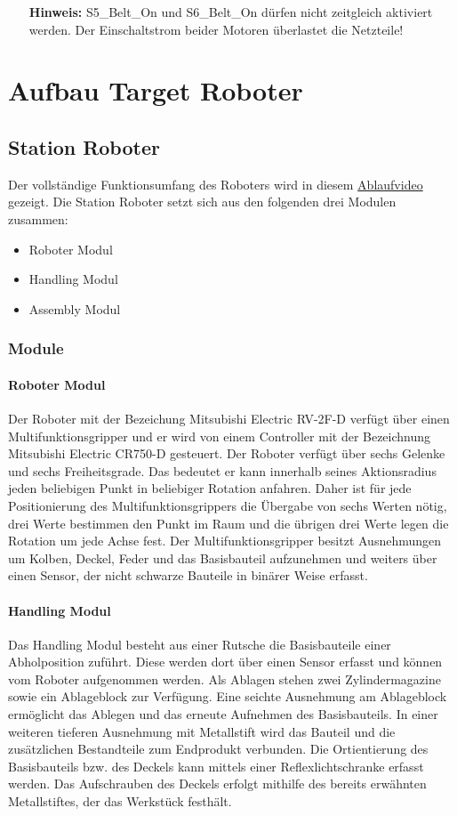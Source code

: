 \documentclass[11pt,a4paper,ngerman]{article}
\begin{document}
\begin{itemize}
	\item[\bf Hinweis:] S5\_Belt\_On und S6\_Belt\_On dürfen nicht zeitgleich aktiviert werden. Der Einschaltstrom beider Motoren überlastet die Netzteile!
\end{itemize}

\section{Aufbau Target Roboter}

\subsection{Station Roboter}
Der vollständige Funktionsumfang des Roboters wird in diesem \href{https://www.youtube.com/watch?v=lkq4dzfn4Q0}{Ablaufvideo} gezeigt. Die Station Roboter setzt sich aus den folgenden drei Modulen zusammen:
\begin{itemize}
	\item Roboter Modul
	\item Handling Modul
	\item Assembly Modul
\end{itemize}
\subsubsection{Module}
\paragraph{Roboter Modul}
Der Roboter mit der Bezeichung Mitsubishi Electric RV-2F-D verfügt über einen Multifunktionsgripper und er wird von einem Controller mit der Bezeichnung Mitsubishi Electric CR750-D gesteuert. Der Roboter verfügt über sechs Gelenke und sechs Freiheitsgrade. Das bedeutet er kann innerhalb seines Aktionsradius jeden beliebigen Punkt in beliebiger Rotation anfahren. Daher ist für jede Positionierung des Multifunktionsgrippers die Übergabe von sechs Werten nötig, drei Werte bestimmen den Punkt im Raum und die übrigen drei Werte legen die Rotation um jede Achse fest. Der Multifunktionsgripper besitzt Ausnehmungen um Kolben, Deckel, Feder und das Basisbauteil aufzunehmen und weiters über einen Sensor, der nicht schwarze Bauteile in binärer Weise erfasst.

\paragraph{Handling Modul}
Das Handling Modul besteht aus einer Rutsche die Basisbauteile einer Abholposition zuführt. Diese werden dort über einen Sensor erfasst und können vom Roboter aufgenommen werden. Als Ablagen stehen zwei Zylindermagazine sowie ein Ablageblock zur Verfügung. Eine seichte Ausnehmung am Ablageblock ermöglicht das Ablegen und das erneute Aufnehmen des Basisbauteils. In einer weiteren tieferen Ausnehmung mit Metallstift wird das Bauteil und die zusätzlichen Bestandteile zum Endprodukt verbunden. Die Ortientierung des Basisbauteils bzw. des Deckels kann mittels einer Reflexlichtschranke erfasst werden. Das Aufschrauben des Deckels erfolgt mithilfe des bereits erwähnten Metallstiftes, der das Werkstück festhält.
\end{document}
